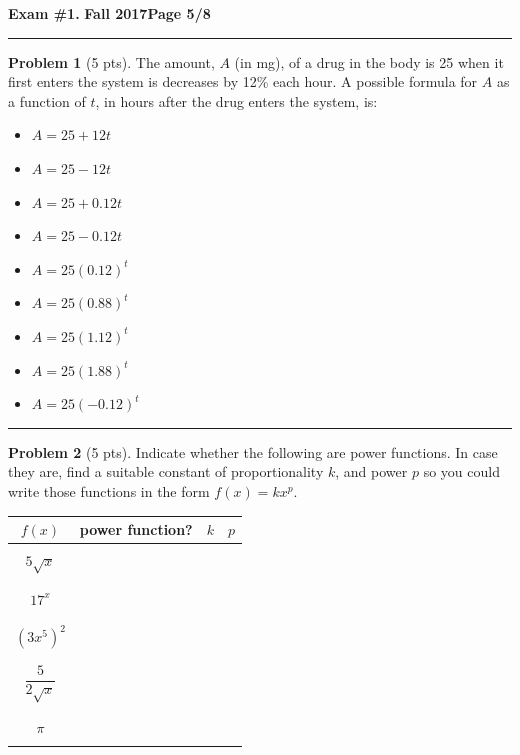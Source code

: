 \documentclass[12pt]{article}
\makeatletter
\theoremstyle{definition}
\newtheorem{problem}{Problem}
\newcommand*{\radiobutton}{%
  \@ifstar{\@radiobutton0}{\@radiobutton1}%
}
\newcommand*{\@radiobutton}[1]{%
  \begin{tikzpicture}
    \pgfmathsetlengthmacro\radius{height("X")/2}
    \draw[radius=\radius] circle;
    \ifcase#1 \fill[radius=.6*\radius] circle;\fi
  \end{tikzpicture}%
}
\makeatother
\begin{document}
\newpage

\hfill{\large\bf Exam \#1.}\hfill{\large\bf
  Fall 2017}\hfill{\large\bf Page 5/8}\hrule

\bigskip

\begin{problem}[5 pts]
The amount, $A$ (in mg), of a drug in the body is 25 when it first enters the system is decreases by 12\% each hour. A possible formula for $A$ as a function of $t$, in hours after the drug enters the system, is:
\begin{itemize}
\item[\radiobutton] $A= 25+12t$
\item[\radiobutton] $A=25-12t$
\item[\radiobutton] $A=25+0.12t$
\item[\radiobutton] $A=25-0.12t$
\item[\radiobutton] $A=25(0.12)^t$
\item[\radiobutton] $A=25(0.88)^t$
\item[\radiobutton] $A=25(1.12)^t$
\item[\radiobutton] $A=25(1.88)^t$
\item[\radiobutton] $A=25(-0.12)^t$
\end{itemize}
\end{problem}

\vspace{1cm}
\hrule

\begin{problem}[5 pts]
Indicate whether the following are power functions. In case they are, find a suitable constant of proportionality $k$, and power $p$ so you could write those functions in the form $f(x) = kx^p$.
\begin{center}
\begin{tabular}{|c|c|c|c|}
\hline
$f(x)$ & power function? & $k$ & $p$ \\
\hline
\hline
&&& \\
$5\sqrt{x}$ &&\hspace{1cm} & \hspace{1cm} \\
&&& \\
\hline
&&& \\
$17^x$ &&& \\
&&& \\
\hline
&&& \\
$(3x^5)^2$ &&& \\
&&& \\
\hline
&&& \\
$\dfrac{5}{2\sqrt{x}}$ &&& \\
&&& \\
\hline
&&& \\
$\pi$ &&& \\
&&& \\
\hline
\end{tabular}
\end{center}
\end{problem}
\newpage
\end{document}
